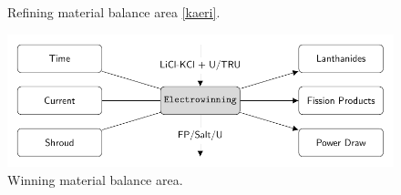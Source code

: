 \begin{frame}
\begin{columns}
\begin{column}{.5\textwidth}
\begin{figure}
			\caption{Refining material balance area \ref{kaeri}.}
			\label{fig:refining}
		\end{figure}
		\begin{figure} 
			\centering
			\includegraphics[width=0.8\linewidth]{winning}
			\caption{Winning material balance area.}
			\label{fig:winning}
		\end{figure}
	\end{column}
\end{columns} 
\end{frame}